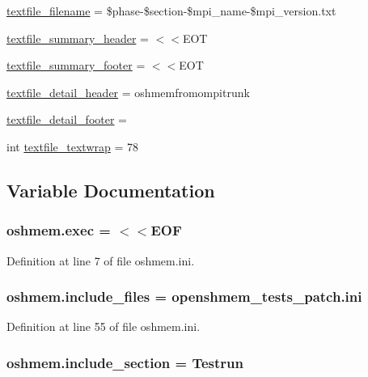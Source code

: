 \begin{DoxyCompactItemize}
\hyperlink{namespaceoshmem_ab7bec292d903dc1e22f6dd1610ac9aad}{textfile\-\_\-filename} = \$phase-\/\$section-\/\$mpi\-\_\-name-\/\$mpi\-\_\-version.\-txt
\item 
\hyperlink{namespaceoshmem_a145ad9a14eac762c5d8f46b444299ef9}{textfile\-\_\-summary\-\_\-header} = $<$$<$E\-O\-T
\item 
\hyperlink{namespaceoshmem_a8aad4aa9999524970a03dbaac95ee861}{textfile\-\_\-summary\-\_\-footer} = $<$$<$E\-O\-T
\item 
\hyperlink{namespaceoshmem_ae5a0095596c3624c7f19ae771452c5d3}{textfile\-\_\-detail\-\_\-header} = oshmemfromompitrunk
\item 
\hyperlink{namespaceoshmem_aec7f6285615e309f4d179fde03e40d8e}{textfile\-\_\-detail\-\_\-footer} =
\item 
int \hyperlink{namespaceoshmem_ab50c730a64d291ffba94c5a3258e7e2d}{textfile\-\_\-textwrap} = 78
\end{DoxyCompactItemize}


\subsection{Variable Documentation}
\hypertarget{namespaceoshmem_a024aa040d2607b8bd6fb76522b0978c3}{
\subsubsection[{exec}]{\setlength{\rightskip}{0pt plus 5cm}oshmem.\-exec = $<$$<$E\-O\-F}}\label{namespaceoshmem_a024aa040d2607b8bd6fb76522b0978c3}


Definition at line 7 of file oshmem.\-ini.

\hypertarget{namespaceoshmem_a2e03864a75569dd951a19041adcf74d7}{
\subsubsection[{include\-\_\-files}]{\setlength{\rightskip}{0pt plus 5cm}oshmem.\-include\-\_\-files = openshmem\-\_\-tests\-\_\-patch.\-ini}}\label{namespaceoshmem_a2e03864a75569dd951a19041adcf74d7}


Definition at line 55 of file oshmem.\-ini.

\hypertarget{namespaceoshmem_a33c00c89fab31d942544e8f99f86736d}{
\subsubsection[{include\-\_\-section}]{\setlength{\rightskip}{0pt plus 5cm}oshmem.\-include\-\_\-section = Testrun}}\label{namespaceoshmem_a33c00c89fab31d942544e8f99f86736d}


